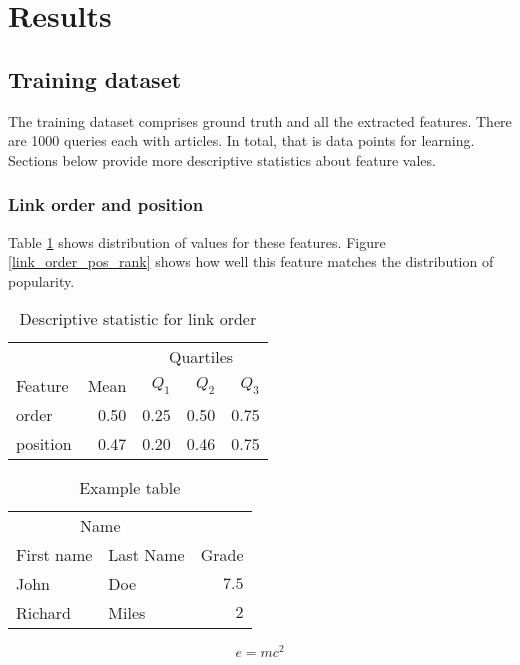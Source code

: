 \section{Results}

\subsection{Training dataset}

The training dataset comprises ground truth and all the extracted features. There are 1000 queries each with  articles. In total, that is  data points for learning. Sections below provide more descriptive statistics about feature vales.

\subsubsection{Link order and position}

Table \ref{link_order_pos_desc} shows distribution of values for these features. Figure \ref{link_order_pos_rank} shows how well this feature matches the distribution of popularity.

\begin{table}[H]
\caption{Descriptive statistic for link order}
\centering
\label{link_order_pos_desc}
\begin{tabular}{lrrrr}
\toprule
& & \multicolumn{3}{c}{Quartiles} \\
\cmidrule{3-5}
Feature & Mean & $Q_1$ & $Q_2$ & $Q_3$ \\
\midrule
order & 0.50 & 0.25 & 0.50 & 0.75 \\
position & 0.47 & 0.20 & 0.46 & 0.75 \\
\bottomrule
\end{tabular}
\end{table}


\begin{table}[H]
\caption{Example table}
\centering
\begin{tabular}{llr}
\toprule
\multicolumn{2}{c}{Name} \\
\cmidrule(r){1-2}
First name & Last Name & Grade \\
\midrule
John & Doe & $7.5$ \\
Richard & Miles & $2$ \\
\bottomrule
\end{tabular}
\end{table}

\lipsum[5] %

\begin{equation}
\label{eq:emc}
e = mc^2
\end{equation}

\lipsum[6] %
